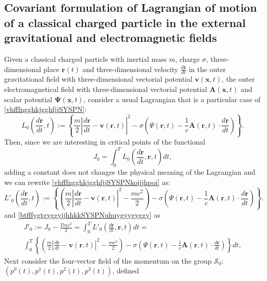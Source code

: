 \documentclass{article}
\theoremstyle{definition}
\theoremstyle{remark}
\renewcommand{\vec}[1]{\mathbf{#1}}
\newcommand{\er}{\eqref}
\newcommand{\er}{\eqref}
\begin{document}
\subsection{Covariant formulation of Lagrangian of motion of a classical
charged particle in the external gravitational and electromagnetic
fields} Given a classical charged particle with inertial mass $m$,
charge $\sigma$, three-dimensional place $\vec r(t)$ and
three-dimensional velocity $\frac{d\vec r}{dt}$ in the outer
gravitational field with three-dimensional vectorial potential $\vec
v(\vec x,t)$, the outer electromagnetical field with
three-dimensional vectorial potential $\vec A(\vec x,t)$ and scalar
potential $\vec \Psi(\vec x,t)$, consider a usual Lagrangian that is
a particular case of \er{vhfffngghkjgghfjjSYSPN}:
\begin{equation}\label{vhfffngghkjgghfjjSYSPNkoijjhpoi}
L_0\left(\frac{d\vec r}{dt},t\right):=
\left\{\frac{m}{2}\left|\frac{d\vec r}{dt}-\vec v(\vec
r,t)\right|^2-\sigma\left(\Psi(\vec r,t)-\frac{1}{c}\vec A(\vec
r,t)\cdot\frac{d\vec r}{dt}\right)\right\}.
\end{equation}
Then, since we are interesting in critical points of the functional
\begin{equation}\label{btfffygtgyggyijhhkkSYSPNuhuygyygyggy}
J_0=\int_0^T L_0\left(\frac{d\vec r}{dt},\vec r,t\right)dt,
\end{equation}
adding a constant does not changes the physical meaning of the
Lagrangian and we can rewrite \er{vhfffngghkjgghfjjSYSPNkoijjhpoi}
as:
\begin{equation}\label{vhfffngghkjgghfjjSYSPNkoijjhpoiuui}
L'_0\left(\frac{d\vec r}{dt},t\right):=
\left\{\left(\frac{m}{2}\left|\frac{d\vec r}{dt}-\vec v(\vec
r,t)\right|^2-\frac{mc^2}{2}\right)-\sigma\left(\Psi(\vec
r,t)-\frac{1}{c}\vec A(\vec r,t)\cdot\frac{d\vec
r}{dt}\right)\right\}.
\end{equation}
and \er{btfffygtgyggyijhhkkSYSPNuhuygyygyggy} as
\begin{multline}\label{btfffygtgyggyijhhkkSYSPNuhuygyygyggyuyy}
J'_0:=J_0-\frac{Tmc^2}{2}=\int_0^T L'_0\left(\frac{d\vec r}{dt},\vec
r,t\right)dt=\\ \int_0^T\left\{\left(\frac{m}{2}\left|\frac{d\vec
r}{dt}-\vec v(\vec
r,t)\right|^2-\frac{mc^2}{2}\right)-\sigma\left(\Psi(\vec
r,t)-\frac{1}{c}\vec A(\vec r,t)\cdot\frac{d\vec
r}{dt}\right)\right\}dt,
\end{multline}
Next consider the four-vector field of the momentum on the group
$\mathcal{S}_0$: $\left(p^0(t),p^1(t),p^2(t),p^3(t)\right)$, defined
\end{document}
